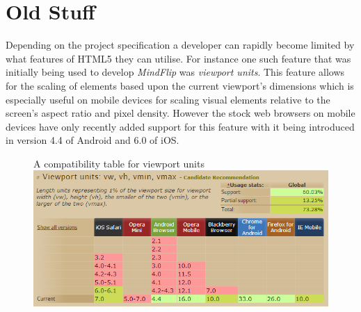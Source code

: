\documentclass[final]{cmpreport}
\begin{document}

\section{Old Stuff}

Depending on the project specification a developer can rapidly become limited by what features of HTML5 they can utilise. For instance one such feature that was initially being used to develop \textit{MindFlip} was \textit{viewport units}. This feature allows for the scaling of elements based upon the current viewport's dimensions which is especially useful on mobile devices for scaling visual elements relative to the screen's aspect ratio and pixel density. However the stock web browsers on mobile devices have only recently added support for this feature with it being introduced in version 4.4 of Android and 6.0 of iOS.

\begin{figure}[h]{A compatibility table for viewport units \label{viewport}}
  \includegraphics[width=1.0\textwidth]{viewport-units.png}
\end{figure}
\end{document}
